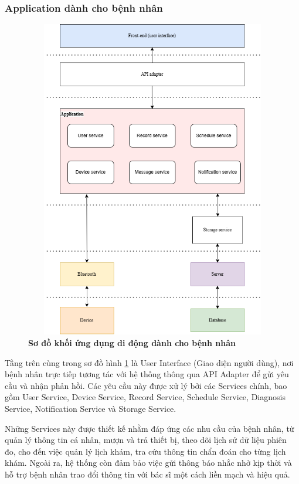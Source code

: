 \subsubsection{Application dành cho bệnh nhân}
\begin{figure}[H]
  \centering
  \includegraphics[width=12cm,height=14cm]{Images/System/fmECG_architecture-Patient-App.drawio.png}
  \caption[Sơ đồ khối application dành cho bệnh nhân]{\bfseries \fontsize{12pt}{0pt}\selectfont Sơ đồ khối ứng dụng di động dành cho bệnh nhân}
  \label{fmECG_architecture-Patient-App} %
\end{figure}
Tầng trên cùng trong sơ đồ hình \ref{fmECG_architecture-Patient-App} là User Interface (Giao diện người dùng), nơi bệnh nhân trực tiếp tương tác với hệ thống thông qua API Adapter để gửi yêu cầu và nhận phản hồi.
Các yêu cầu này được xử lý bởi các Services chính, bao gồm User Service, Device Service, Record Service, Schedule Service, Diagnosis Service, Notification Service và Storage Service.

Những Services này được thiết kế nhằm đáp ứng các nhu cầu của bệnh nhân, từ quản lý thông tin cá nhân, mượn và trả thiết bị, theo dõi lịch sử dữ liệu phiên đo, cho đến việc quản lý lịch khám,
tra cứu thông tin chẩn đoán cho từng lịch khám. Ngoài ra, hệ thống còn đảm bảo việc gửi thông báo nhắc nhở kịp thời và hỗ trợ bệnh nhân trao đổi thông tin với bác sĩ một cách liền mạch và hiệu quả.

